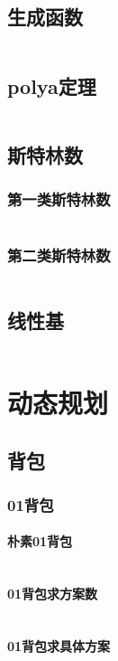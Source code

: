 \documentclass[a4paper,10pt]{article}
\begin{document}
\subsection{生成函数}
\inputminted[breaklines, linenos]{c++}{math/gf.cc}
\subsection{polya定理}
\inputminted[breaklines, linenos]{c++}{math/polya.cc}
\subsection{斯特林数}
\subsubsection{第一类斯特林数}
\inputminted[breaklines, linenos]{c++}{math/stirling1.cc}
\subsubsection{第二类斯特林数}
\inputminted[breaklines, linenos]{c++}{math/stirling2.cc}
\subsection{线性基}
\inputminted[breaklines, linenos]{c++}{math/xor.cc}

\newpage
\section{动态规划}
\subsection{背包}
\subsubsection{01背包}
\paragraph{朴素01背包}
\inputminted[breaklines, linenos]{c++}{dp/bag/01.cc}
\paragraph{01背包求方案数}
\inputminted[breaklines, linenos]{c++}{dp/bag/sum.cc}
\paragraph{01背包求具体方案}
\inputminted[breaklines, linenos]{c++}{dp/bag/01_way.cc}
\end{document}
